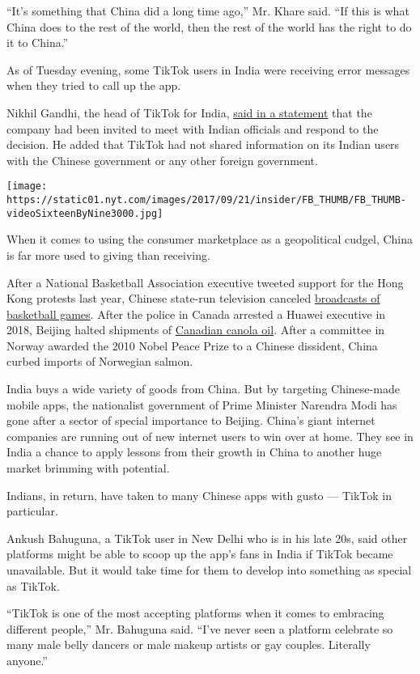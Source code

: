 ``It's something that China did a long time ago,'' Mr. Khare said. ``If
this is what China does to the rest of the world, then the rest of the
world has the right to do it to China.''

As of Tuesday evening, some TikTok users in India were receiving error
messages when they tried to call up the app.

Nikhil Gandhi, the head of TikTok for India,
\href{https://twitter.com/TikTok_IN/status/1277811841364668416}{said in
a statement} that the company had been invited to meet with Indian
officials and respond to the decision. He added that TikTok had not
shared information on its Indian users with the Chinese government or
any other foreign government.

\texttt{[image: https://static01.nyt.com/images/2017/09/21/insider/FB\_THUMB/FB\_THUMB-videoSixteenByNine3000.jpg]}

When it comes to using the consumer marketplace as a geopolitical
cudgel, China is far more used to giving than receiving.

After a National Basketball Association executive tweeted support for
the Hong Kong protests last year, Chinese state-run television canceled
\href{https://www.nytimes.com/2020/02/14/sports/nba-china-hong-kong-protests.html}{broadcasts
of basketball games}. After the police in Canada arrested a Huawei
executive in 2018, Beijing halted shipments of
\href{https://www.nytimes.com/2019/05/16/world/asia/china-canadian-arrested.html}{Canadian
canola oil}. After a committee in Norway awarded the 2010 Nobel Peace
Prize to a Chinese dissident, China curbed imports of Norwegian salmon.

India buys a wide variety of goods from China. But by targeting
Chinese-made mobile apps, the nationalist government of Prime Minister
Narendra Modi has gone after a sector of special importance to Beijing.
China's giant internet companies are running out of new internet users
to win over at home. They see in India a chance to apply lessons from
their growth in China to another huge market brimming with potential.

Indians, in return, have taken to many Chinese apps with gusto ---
TikTok in particular.

Ankush Bahuguna, a TikTok user in New Delhi who is in his late 20s, said
other platforms might be able to scoop up the app's fans in India if
TikTok became unavailable. But it would take time for them to develop
into something as special as TikTok.

``TikTok is one of the most accepting platforms when it comes to
embracing different people,'' Mr. Bahuguna said. ``I've never seen a
platform celebrate so many male belly dancers or male makeup artists or
gay couples. Literally anyone.''

